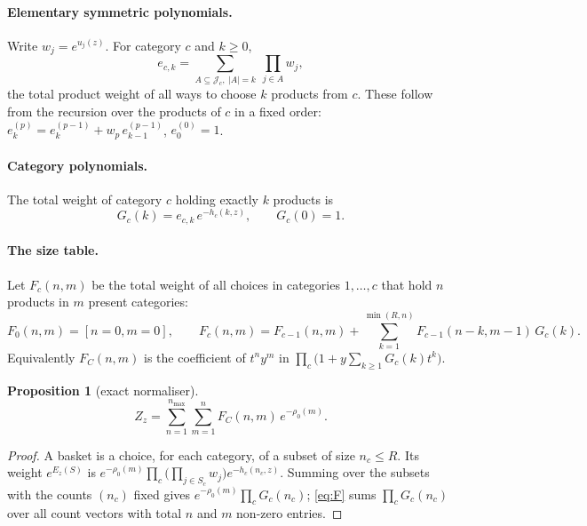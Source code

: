\documentclass[11pt,a4paper]{article}
\newtheorem{proposition}{Proposition}
\theoremstyle{remark}
\begin{document}
\paragraph{Elementary symmetric polynomials.} Write $w_j=e^{u_j(z)}$. For category $c$ and $k\ge0$,
\[
e_{c,k}=\sum_{A\subseteq\mathcal J_c,\ |A|=k}\ \prod_{j\in A}w_j ,
\]
the total product weight of all ways to choose $k$ products from $c$. These follow from the recursion
over the products of $c$ in a fixed order: $e^{(p)}_k=e^{(p-1)}_k+w_p\,e^{(p-1)}_{k-1}$, $e^{(0)}_0=1$.

\paragraph{Category polynomials.} The total weight of category $c$ holding exactly $k$ products is
\begin{equation}
G_c(k)=e_{c,k}\,e^{-h_c(k,z)},\qquad G_c(0)=1 .
\label{eq:G}
\end{equation}

\paragraph{The size table.} Let $F_c(n,m)$ be the total weight of all choices in categories $1,\dots,c$
that hold $n$ products in $m$ present categories:
\begin{equation}
F_0(n,m)=[n=0,m=0],\qquad
F_c(n,m)=F_{c-1}(n,m)+\sum_{k=1}^{\min(R,n)}F_{c-1}(n-k,m-1)\,G_c(k).
\label{eq:F}
\end{equation}
Equivalently $F_C(n,m)$ is the coefficient of $t^n y^m$ in $\prod_c\big(1+y\sum_{k\ge1}G_c(k)t^k\big)$.

\begin{proposition}[exact normaliser]
\begin{equation}
Z_z=\sum_{n=1}^{n_{\max}}\sum_{m=1}^{n}F_C(n,m)\,e^{-\rho_0(m)} .
\label{eq:Z}
\end{equation}
\end{proposition}
\begin{proof}
A basket is a choice, for each category, of a subset of size $n_c\le R$. Its weight $e^{E_z(S)}$ is
$e^{-\rho_0(m)}\prod_c\big(\prod_{j\in S_c}w_j\big)e^{-h_c(n_c,z)}$. Summing over the subsets with the counts
$(n_c)$ fixed gives $e^{-\rho_0(m)}\prod_c G_c(n_c)$; \eqref{eq:F} sums $\prod_cG_c(n_c)$ over all count
vectors with total $n$ and $m$ non-zero entries.
\end{proof}
\end{document}
